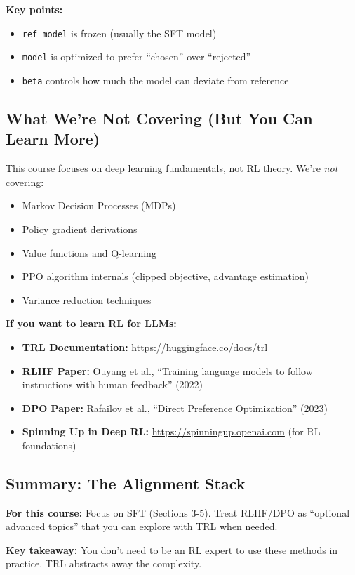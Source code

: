 \documentclass{article}
\begin{document}
\textbf{Key points:}
\begin{itemize}
\item \texttt{ref\_model} is frozen (usually the SFT model)
\item \texttt{model} is optimized to prefer ``chosen'' over ``rejected''
\item \texttt{beta} controls how much the model can deviate from reference
\end{itemize}

\subsection{What We're Not Covering (But You Can Learn More)}

This course focuses on deep learning fundamentals, not RL theory. We're \textit{not} covering:

\begin{itemize}
\item Markov Decision Processes (MDPs)
\item Policy gradient derivations
\item Value functions and Q-learning
\item PPO algorithm internals (clipped objective, advantage estimation)
\item Variance reduction techniques
\end{itemize}

\textbf{If you want to learn RL for LLMs:}
\begin{itemize}
\item \textbf{TRL Documentation:} \url{https://huggingface.co/docs/trl}
\item \textbf{RLHF Paper:} Ouyang et al., ``Training language models to follow instructions with human feedback'' (2022)
\item \textbf{DPO Paper:} Rafailov et al., ``Direct Preference Optimization'' (2023)
\item \textbf{Spinning Up in Deep RL:} \url{https://spinningup.openai.com} (for RL foundations)
\end{itemize}

\subsection{Summary: The Alignment Stack}

\begin{center}
\end{center}

\textbf{For this course:} Focus on SFT (Sections 3-5). Treat RLHF/DPO as ``optional advanced topics'' that you can explore with TRL when needed.

\textbf{Key takeaway:} You don't need to be an RL expert to use these methods in practice. TRL abstracts away the complexity.
\end{document}
